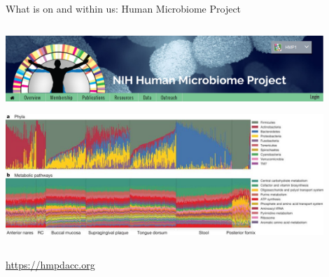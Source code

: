 \documentclass[10pt]{beamer}
\begin{document}
\begin{frame}{What is on and within us: Human Microbiome Project}
	\begin{columns}
		\column{\dimexpr\paperwidth-10pt}
		\begin{center}
			\includegraphics[width=0.9\textwidth]{./figures/humanmicrobiome.png}\par
			\includegraphics[width=0.9\textwidth]{./figures/hmp-fig.jpg}
		\end{center}
	\end{columns}
	\url{https://hmpdacc.org}
\end{frame}
\end{document}
